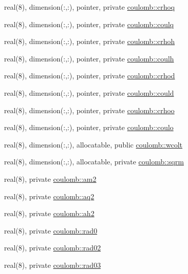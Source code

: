 \begin{DoxyCompactItemize}
\item 
real(8), dimension(\+:,\+:), pointer, private \hyperlink{namespacecoulomb_afc907325042890495f83d5596ab1deb7}{coulomb\+::crhoq}
\item 
real(8), dimension(\+:,\+:), pointer, private \hyperlink{namespacecoulomb_af61c3d4b51a718e10c0f3c8c61dfbc3b}{coulomb\+::coulq}
\item 
real(8), dimension(\+:,\+:), pointer, private \hyperlink{namespacecoulomb_a56407c554275cc11a67a47980763d288}{coulomb\+::crhoh}
\item 
real(8), dimension(\+:,\+:), pointer, private \hyperlink{namespacecoulomb_ab5865baa231f13af37435598841c083b}{coulomb\+::coulh}
\item 
real(8), dimension(\+:,\+:), pointer, private \hyperlink{namespacecoulomb_aae489523d013394686a4eccecbd8e671}{coulomb\+::crhod}
\item 
real(8), dimension(\+:,\+:), pointer, private \hyperlink{namespacecoulomb_a3e49f8ac37da702af3537929c4ceec49}{coulomb\+::could}
\item 
real(8), dimension(\+:,\+:), pointer, private \hyperlink{namespacecoulomb_a2815a44e5c576913488ddb7b3e67324d}{coulomb\+::crhoo}
\item 
real(8), dimension(\+:,\+:), pointer, private \hyperlink{namespacecoulomb_a0c3ad1d6aead6c0e5df604afc7f5b682}{coulomb\+::coulo}
\item 
real(8), dimension(\+:,\+:), allocatable, public \hyperlink{namespacecoulomb_a7fb786776bc5f65a639b10f9966ee2ee}{coulomb\+::wcolt}
\item 
real(8), dimension(\+:,\+:), allocatable, private \hyperlink{namespacecoulomb_ae1cdbea5b00603d6ba85ce2d3e0bf612}{coulomb\+::sqrm}
\item 
real(8), private \hyperlink{namespacecoulomb_ac7f2a0f0ede9bb820c275586d5f8cacb}{coulomb\+::am2}
\item 
real(8), private \hyperlink{namespacecoulomb_aa8782d256d115e0d23441160078bd1c5}{coulomb\+::aq2}
\item 
real(8), private \hyperlink{namespacecoulomb_a87a3eab5442a0668be2dfe42f7024081}{coulomb\+::ah2}
\item 
real(8), private \hyperlink{namespacecoulomb_a207e347f3d5016b81ac37a1310c2919a}{coulomb\+::rad0}
\item 
real(8), private \hyperlink{namespacecoulomb_a0776ab9d5ae0ca608ddbf4d147063405}{coulomb\+::rad02}
\item 
real(8), private \hyperlink{namespacecoulomb_a9de74ed78e9600b349fa66222b9c19fb}{coulomb\+::rad03}

\end{DoxyCompactItemize}
